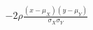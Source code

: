 \documentclass[preview]{standalone}
\begin{document}
\begin{align*}
- 2 \rho \frac{(x - \mu_X)(y - \mu_Y)}{\sigma_X \sigma_Y}
\end{align*}
\end{document}
